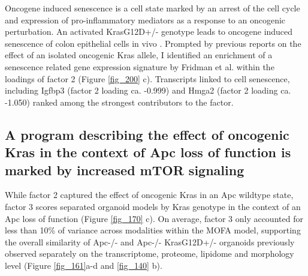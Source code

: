 \begin{flushleft}
\bigbreak

Oncogene induced senescence is a cell state marked by an arrest of the cell cycle and expression of pro-inflammatory mediators as a response to an oncogenic perturbation. An activated KrasG12D+/- genotype leads to oncogene induced senescence of colon epithelial cells in vivo . Prompted by previous reports on the effect of an isolated oncogenic Kras allele, I identified an enrichment of a senescence related gene expression signature by Fridman et al. within the loadings of factor 2 \citep{Fridman2008-ky} (Figure \ref{fig_200} c). Transcripts linked to cell senescence, including Igfbp3 (factor 2 loading ca. -0.999) and Hmga2 (factor 2 loading ca. -1.050) ranked among the strongest contributors to the factor. 
\bigbreak


\newpage
\subsection{A program describing the effect of oncogenic Kras in the context of Apc loss of function is marked by increased mTOR signaling }

While factor 2 captured the effect of oncogenic Kras in an Apc wildtype state, factor 3 scores separated organoid models by Kras genotype in the context of an Apc loss of function (Figure \ref{fig_170} c). On average, factor 3 only accounted for less than 10\% of variance across modalities within the MOFA model, supporting the overall similarity of Apc-/- and Apc-/- KrasG12D+/- organoids previously observed separately on the transcriptome, proteome, lipidome and morphology level (Figure \ref{fig_161}a-d and \ref{fig_140} b).


\end{flushleft}
